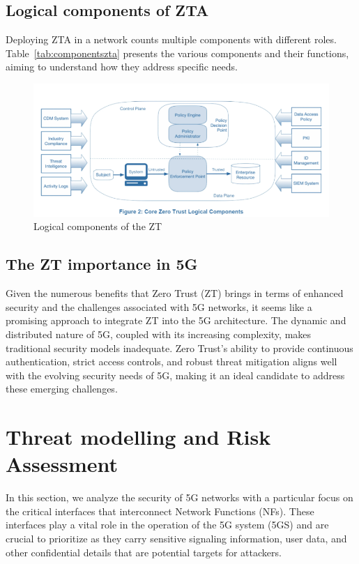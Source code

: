 \documentclass{report}
\begin{document}
\subsection{Logical components of ZTA}
Deploying ZTA in a network counts multiple components with different roles. Table~\ref{tab:componentszta} presents the various components and their functions, aiming to understand how they address specific needs.
\begin{figure}[H]
    \centering
    \includegraphics[width=0.65\linewidth]{figures/ZT components.png}
    \caption{Logical components of the ZT\cite{stafford2020zero}}
    \label{fig:logicalcomp}
\end{figure}

\subsection{The ZT importance in 5G}
Given the numerous benefits that Zero Trust (ZT) brings in terms of enhanced security and the challenges associated with 5G networks, it seems like a promising approach to integrate ZT into the 5G architecture. The dynamic and distributed nature of 5G, coupled with its increasing complexity, makes traditional security models inadequate. Zero Trust's ability to provide continuous authentication, strict access controls, and robust threat mitigation aligns well with the evolving security needs of 5G, making it an ideal candidate to address these emerging challenges.




\section{Threat modelling and Risk Assessment}
In this section, we analyze the security of 5G networks with a particular focus on the critical interfaces that interconnect Network Functions (NFs). These interfaces play a vital role in the operation of the 5G system (5GS) and are crucial to prioritize as they carry sensitive signaling information, user data, and other confidential details that are potential targets for attackers.
\end{document}
